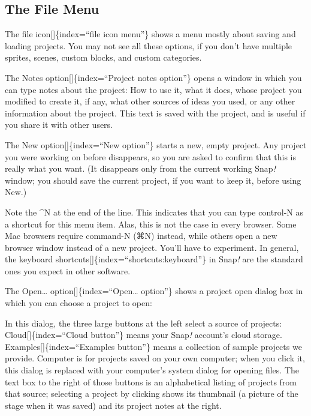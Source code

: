 \documentclass[
  letterpaper,
]{book}
\begin{document}
\subsection{The File Menu}\label{the-file-menu}

The file icon{[}{]}\{index=``file icon menu''\} shows a menu mostly
about saving and loading projects. You may not see all these options, if
you don't have multiple sprites, scenes, custom blocks, and custom
categories.

The Notes option{[}{]}\{index=``Project notes option''\} opens a window
in which you can type notes about the project: How to use it, what it
does, whose project you modified to create it, if any, what other
sources of ideas you used, or any other information about the project.
This text is saved with the project, and is useful if you share it with
other users.

The New option{[}{]}\{index=``New option''\} starts a new, empty
project. Any project you were working on before disappears, so you are
asked to confirm that this is really what you want. (It disappears only
from the current working Snap\emph{!} window; you should save the
current project, if you want to keep it, before using New.)

Note the \^{}N at the end of the line. This indicates that you can type
control-N as a shortcut for this menu item. Alas, this is not the case
in every browser. Some Mac browsers require command-N (⌘N) instead,
while others open a new browser window instead of a new project. You'll
have to experiment. In general, the keyboard
shortcuts{[}{]}\{index=``shortcuts:keyboard''\} in Snap\emph{!} are the
standard ones you expect in other software.

The Open\ldots{} option{[}{]}\{index=``Open\ldots{} option''\} shows a
project open dialog box in which you can choose a project to open:

In this dialog, the three large buttons at the left select a source of
projects: Cloud{[}{]}\{index=``Cloud button''\} means your Snap\emph{!}
account's cloud storage. Examples{[}{]}\{index=``Examples button''\}
means a collection of sample projects we provide. Computer is for
projects saved on your own computer; when you click it, this dialog is
replaced with your computer's system dialog for opening files. The text
box to the right of those buttons is an alphabetical listing of projects
from that source; selecting a project by clicking shows its thumbnail (a
picture of the stage when it was saved) and its project notes at the
right.
\end{document}
